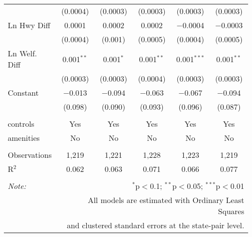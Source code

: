 \begin{table}[!htbp]
\begin{tabular}{@{\extracolsep{5pt}}lccccc}
  & (0.0004) & (0.0003) & (0.0003) & (0.0003) & (0.0003) \\ 
  Ln Hwy Diff & 0.0001 & 0.0002 & 0.0002 & $-$0.0004 & $-$0.0003 \\ 
  & (0.0004) & (0.001) & (0.0005) & (0.0004) & (0.0005) \\ 
  Ln Welf. Diff & 0.001$^{**}$ & 0.001$^{*}$ & 0.001$^{**}$ & 0.001$^{***}$ & 0.001$^{**}$ \\ 
  & (0.0003) & (0.0003) & (0.0004) & (0.0003) & (0.0003) \\ 
  Constant & $-$0.013 & $-$0.094 & $-$0.063 & $-$0.067 & $-$0.094 \\ 
  & (0.098) & (0.090) & (0.093) & (0.096) & (0.087) \\ 
 \hline \\[-1.8ex] 
controls & Yes & Yes & Yes & Yes & Yes \\ 
amenities & No & No & No & No & No \\ 
\hline \\[-1.8ex] 
Observations & 1,219 & 1,221 & 1,228 & 1,223 & 1,219 \\ 
R$^{2}$ & 0.062 & 0.063 & 0.071 & 0.066 & 0.077 \\ 
\hline 
\hline \\[-1.8ex] 
\textit{Note:}  & \multicolumn{5}{r}{$^{*}$p$<$0.1; $^{**}$p$<$0.05; $^{***}$p$<$0.01} \\ 
 & \multicolumn{5}{r}{All models are estimated with Ordinary Least Squares} \\ 
 & \multicolumn{5}{r}{and clustered standard errors at the state-pair level.} \\ 
\end{tabular} 
\end{table} 
